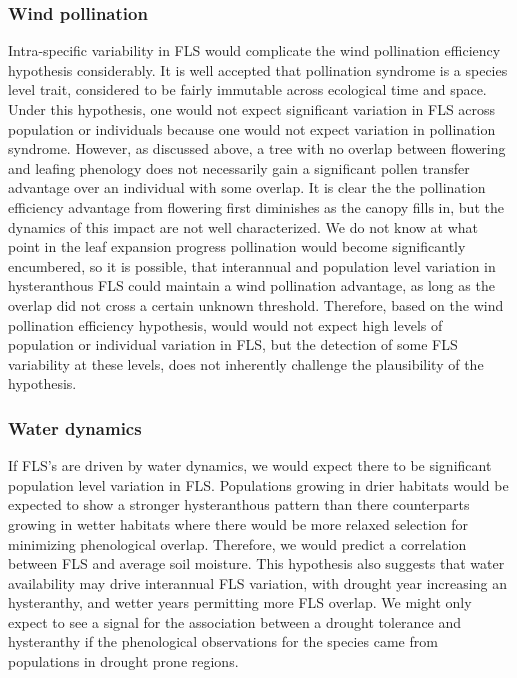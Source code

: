 \documentclass[12pt]{article}\usepackage[]{graphicx}\usepackage[]{color}
\begin{document}
\subsubsection*{Wind pollination} 
\indent\indent Intra-specific variability in FLS would complicate the wind pollination efficiency hypothesis considerably.  It is well accepted that pollination syndrome is a species level trait, considered to be fairly immutable across ecological time and space. Under this hypothesis, one would not expect significant variation in FLS across population or individuals because one would not expect variation in pollination syndrome. However, as discussed above, a tree with no overlap between flowering and leafing phenology does not necessarily gain a significant pollen transfer advantage over an individual with some overlap. It is clear the the pollination efficiency advantage from flowering first diminishes as the canopy fills in, but the dynamics of this impact are not well characterized. We do not know at what point in the leaf expansion progress pollination would become significantly encumbered, so it is possible, that interannual and population level variation in hysteranthous FLS could maintain a wind pollination advantage, as long as the overlap did not cross a certain unknown threshold. Therefore, based on the wind pollination efficiency hypothesis, would would not expect high levels of population or individual variation in FLS, but the detection of some FLS variability at these levels, does not inherently challenge the plausibility of the hypothesis. %
\subsubsection*{Water dynamics} 
\indent\indent If FLS's are driven by water dynamics, we would expect there to be significant population level variation in FLS. Populations growing in drier habitats would be expected to show a stronger hysteranthous pattern than there counterparts growing in wetter habitats where there would be more relaxed selection for minimizing phenological overlap. Therefore, we would predict a correlation between FLS and average soil moisture. This hypothesis also suggests that water availability may drive interannual FLS variation, with drought year increasing an hysteranthy, and wetter years permitting more FLS overlap. We might only expect to see a signal for the association between a drought tolerance and hysteranthy if the phenological observations for the species came from populations in drought prone regions. 
\end{document}
